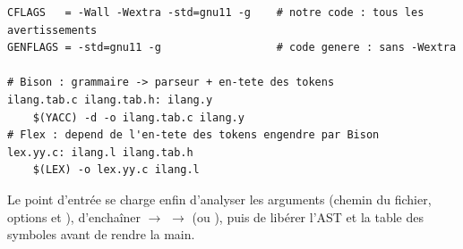 \begin{lstlisting}[style=gram,caption={Séparation des jeux d'options (extrait du \code{Makefile}).}]
CFLAGS   = -Wall -Wextra -std=gnu11 -g    # notre code : tous les avertissements
GENFLAGS = -std=gnu11 -g                  # code genere : sans -Wextra

# Bison : grammaire -> parseur + en-tete des tokens
ilang.tab.c ilang.tab.h: ilang.y
	$(YACC) -d -o ilang.tab.c ilang.y
# Flex : depend de l'en-tete des tokens engendre par Bison
lex.yy.c: ilang.l ilang.tab.h
	$(LEX) -o lex.yy.c ilang.l
\end{lstlisting}

Le point d'entrée  se charge enfin d'analyser les arguments (chemin
du fichier, options  et ), d'enchaîner
 $\to$  $\to$  (ou
), puis de libérer l'AST et la table des symboles avant de
rendre la main.
